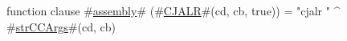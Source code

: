 function clause #\hyperref[sailMIPSzassembly]{assembly}# (#\hyperref[sailMIPSzCJALR]{CJALR}#(cd, cb, true)) = "cjalr " ^ #\hyperref[sailMIPSzstrCCArgs]{strCCArgs}#(cd, cb)
